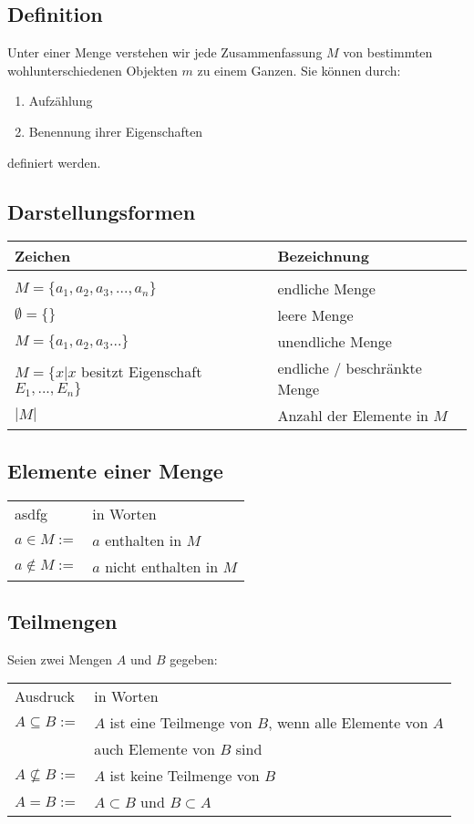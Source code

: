\subsection{Definition}
Unter einer Menge verstehen wir jede Zusammenfassung $M$ von bestimmten wohlunterschiedenen
Objekten $m$ zu einem Ganzen. Sie können durch:
\begin{enumerate}
    \item Aufzählung
    \item Benennung ihrer Eigenschaften
\end{enumerate}
definiert werden.


\subsection{Darstellungsformen}


\begin{tabular}{ll}
    Zeichen & Bezeichnung \\
    \hline \\ 
    $M=\{a_1,a_2,a_3,...,a_n\}$ & endliche Menge \\
    \hline
    $\emptyset =\{\}$ & leere Menge \\
    \hline
    $M=\{a_1,a_2,a_3...\}$ & unendliche Menge \\
    \hline
    $M=\{x|x$ besitzt Eigenschaft $E_1,...,E_n\}$ & endliche / beschränkte Menge \\
    \hline
    $|M|$ & Anzahl der Elemente in $M$ \\
\end{tabular}
    
    
    \subsection{Elemente einer Menge}
    \begin{tabular}{ll}
        asdfg & in Worten \\
    $a\in M:=$ & $a$ enthalten in $M$ \\
    $a\notin M:=$ & $a$ nicht enthalten in $M$ \\
\end{tabular}

\subsection{Teilmengen}

Seien zwei Mengen $A$ und $B$ gegeben:

\begin{tabular}{ll}
    Ausdruck & in Worten \\
    $A\subseteq B:=$ & $A$ ist eine Teilmenge von $B$, wenn alle Elemente von $A$ \\
    &auch Elemente von $B$ sind \\
    \(A \nsubseteq B:=\) & $A$ ist keine Teilmenge von $B$ \\
    \(A = B:=\) & $A \subset B$ und $B \subset A$ \\
\end{tabular}

